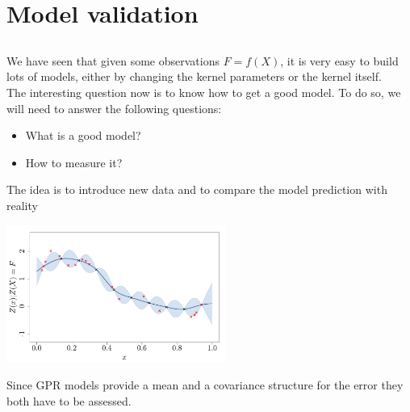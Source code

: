 \section{Model validation}
\subsection{}

\begin{frame}{}
We have seen that given some observations $F=f(X)$, it is very easy to build lots of models, either by changing the kernel parameters or the kernel itself.\\ \vspace{5mm}
The interesting question now is to know how to get a good model. To do so, we will need to answer the following questions:
\begin{itemize}
	\item What is a good model?
	\item How to measure it?
\end{itemize}
\end{frame}

\begin{frame}{}
The idea is to introduce new data and to compare the model prediction with reality
\begin{center}
\includegraphics[height=4.5cm]{3_gaussian_process_regression/figures/R/VALID_testset}
\end{center}
\vspace{3mm}
Since GPR models provide a mean and a covariance structure for the error they both have to be assessed.
\end{frame}

